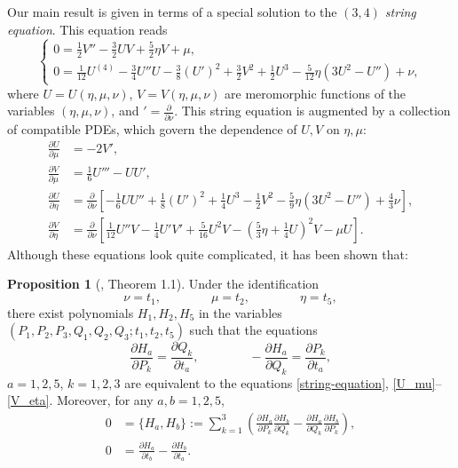 \documentclass[usenames,dvipsnames]{article}
\theoremstyle{definition}
\newtheorem{prop}{Proposition}[section]
\numberwithin{equation}{section}
\numberwithin{figure}{section}
\begin{document}
Our main result is given in terms of a special solution to the \textit{$(3,4)$ string equation}. This equation reads
    \begin{equation} \label{string-equation}
        \begin{cases}
             0 = \frac{1}{2}V'' - \frac{3}{2}UV + \frac{5}{2}\eta V + \mu,\\
             0 = \frac{1}{12} U^{(4)} -\frac{3}{4}U''U -\frac{3}{8}(U')^2+\frac{3}{2}V^2 + \frac{1}{2}U^3 - \frac{5}{12}\eta \left(3U^2 - U''\right) + \nu,
        \end{cases}
    \end{equation}
where $U = U(\eta,\mu,\nu)$, $V= V(\eta,\mu,\nu)$ are meromorphic functions of the variables $(\eta,\mu,\nu)$, and $' = \frac{\partial}{\partial \nu}$. This string equation is augmented by a collection of compatible PDEs, which govern the dependence of $U,V$ on $\eta,\mu$:
    \begin{align}
            \frac{\partial U}{\partial \mu} &= -2V', \label{U_mu}\\
            \frac{\partial V}{\partial \mu} &= \frac{1}{6}U''' - UU', \label{V_mu}\\
            \frac{\partial U}{\partial \eta} &=\frac{\partial}{\partial \nu}\left[-\frac{1}{6}UU'' + \frac{1}{8}(U')^2 + \frac{1}{4}U^3 - 
            \frac{1}{2}V^2 - \frac{5}{9}\eta\left(3U^2-U''\right) + \frac{4}{3}\nu\right],\label{U_eta}\\
            \frac{\partial V}{\partial \eta} &= \frac{\partial}{\partial \nu}\left[ \frac{1}{12}U''V - \frac{1}{4}U'V' + \frac{5}{16}U^2V - \left(\frac{5}{3}\eta + \frac{1}{4}U\right)^2V - \mu U\right]\label{V_eta}.
        \end{align}
Although these equations look quite complicated, it has been shown that:
\begin{prop}[\cite{DHL2}, Theorem 1.1] \label{AAA}
    Under the identification
        \begin{equation*}
            \nu = t_1, \qquad \qquad \mu=t_2,\qquad \qquad\eta = t_5,
        \end{equation*}
    there exist polynomials $H_1,H_2,H_5$ in the variables $(P_1,P_2,P_3,Q_1,Q_2,Q_3;t_1,t_2,t_5)$ such that the equations
        \begin{equation}
            \frac{\partial H_a}{\partial P_k} = \frac{\partial Q_k}{\partial t_a},\qquad\qquad -\frac{\partial H_a}{\partial Q_k} = \frac{\partial P_k}{\partial t_a},
        \end{equation}
    $a=1,2,5$, $k=1,2,3$ are equivalent to the equations \eqref{string-equation}, \eqref{U_mu}--\eqref{V_eta}. Moreover, for any $a,b=1,2,5$,
    \begin{align}
        0&= \{H_a,H_b\}:= \sum_{k=1}^{3}\left(\frac{\partial H_a}{\partial P_k}\frac{\partial H_b}{\partial Q_k}-\frac{\partial H_a}{\partial Q_k}\frac{\partial H_b}{\partial P_k}\right),\\
        0&=\frac{\partial H_a}{\partial t_b} - \frac{\partial H_b}{\partial t_a}.
    \end{align}
\end{prop}
\end{document}
